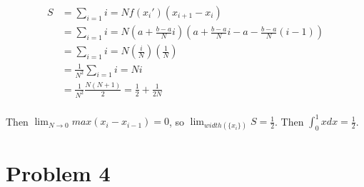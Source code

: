 \documentclass[10pt]{article} %
\begin{document}
\begin{align*}
  S &= \sum_{i=1}{i=N}f(x_i')(x_{i+1}-x_i)\\
  &= \sum_{i=1}{i=N}\left(a+\frac{b-a}{N}i\right)\left(a+\frac{b-a}{N}i - a -\frac{b-a}{N}(i-1)\right)\\
  &= \sum_{i=1}{i=N}\left(\frac{i}{N}\right)\left(\frac{1}{N}\right)\\
  &= \frac{1}{N^2}\sum_{i=1}{i=N}i\\
  &= \frac{1}{N^2}\frac{N(N+1)}{2} = \frac{1}{2} + \frac{1}{2N}\\
\end{align*}

Then $\lim_{N\rightarrow0} max(x_i-x_{i-1}) = 0$, so $\lim_{width(\{x_i\})} S = \frac{1}{2}$. Then $\int_0^1xdx = \frac{1}{2}$.\\


\section{Problem 4}
\end{document}
